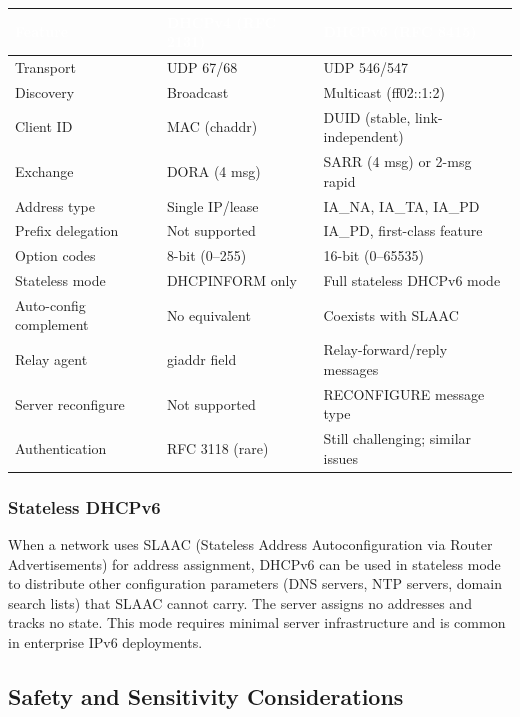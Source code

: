 \documentclass[11pt,letterpaper]{article}
\newcommand{\tableheader}[1]{\textbf{\sffamily\textcolor{white}{#1}}}
\begin{document}
\begin{center}
\begin{tabularx}{\textwidth}{L{3.5cm}L{4.5cm}X}
\toprule
{}
\tableheader{Feature} & \tableheader{DHCPv4 (RFC 2131)} & \tableheader{DHCPv6 (RFC 8415)} \\
\midrule
Transport & UDP 67/68 & UDP 546/547 \\
Discovery & Broadcast & Multicast (ff02::1:2) \\
Client ID & MAC (chaddr) & DUID (stable, link-independent) \\
Exchange & DORA (4 msg) & SARR (4 msg) or 2-msg rapid \\
Address type & Single IP/lease & IA\_NA, IA\_TA, IA\_PD \\
Prefix delegation & Not supported & IA\_PD, first-class feature \\
Option codes & 8-bit (0--255) & 16-bit (0--65535) \\
Stateless mode & DHCPINFORM only & Full stateless DHCPv6 mode \\
Auto-config complement & No equivalent & Coexists with SLAAC \\
Relay agent & giaddr field & Relay-forward/reply messages \\
Server reconfigure & Not supported & RECONFIGURE message type \\
Authentication & RFC 3118 (rare) & Still challenging; similar issues \\
\bottomrule
\end{tabularx}
\end{center}

\subsubsection{Stateless DHCPv6}

When a network uses SLAAC (Stateless Address Autoconfiguration via Router Advertisements) for address assignment, DHCPv6 can be used in stateless mode to distribute other configuration parameters (DNS servers, NTP servers, domain search lists) that SLAAC cannot carry. The server assigns no addresses and tracks no state. This mode requires minimal server infrastructure and is common in enterprise IPv6 deployments.

\subsection{Safety and Sensitivity Considerations}
\end{document}
